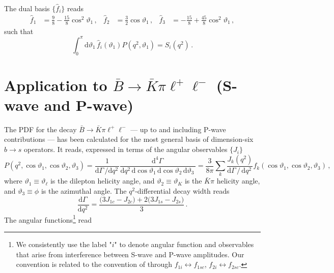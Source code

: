 \documentclass[aps,prd,reprint,nofootinbib,preprintnumbers]{revtex4}
\newcommand{\rmdx}[1]{\mbox{d} #1 \,} %
\renewcommand{\theta}{\vartheta}
\begin{document}
The dual basis $\lbrace \hat{f}_i\rbrace$ reads
\begin{equation}
\begin{aligned}
    \hat{f}_1 & = \frac{9}{8} - \frac{15}{8}\cos^2\theta_1\,, &
    \hat{f}_2 & = \frac{3}{2}\cos\theta_1\,, &
    \hat{f}_3 & = -\frac{15}{8} + \frac{45}{8}\cos^2\theta_1\,,
\end{aligned}
\end{equation}
such that
\begin{equation}
    \int_0^\pi \rmdx{\theta_1} \hat{f}_i(\theta_1) P(q^2, \theta_1) = S_i(q^2)\,.
\end{equation}

\section{Application to $\bar{B}\to\bar{K}\pi\ell^+\ell^-$ (S-wave and P-wave)}
\label{app:btokstarll}
The PDF for the decay $\bar{B}\to\bar{K}\pi\ell^+\ell^-$ --- up to and including P-wave contributions --- has been calculated
for the most general basis of dimension-six $b\to s$ operators. It reads, expressed in terms of the angular observables $\lbrace J_i\rbrace$ \cite{Blake:2012mb,Bobeth:2012vn}
\begin{equation}
    P(q^2, \cos\theta_1, \cos\theta_2, \theta_3) = \frac{1}{\rmdx{\Gamma}/\rmdx{q^2}} \frac{\rmdx{^4\Gamma}}{\rmdx{q^2} \rmdx{\cos\theta_1} \rmdx{\cos\theta_2} \rmdx{\theta_3}} = \frac{3}{8\pi} \sum_k \frac{J_{k}(q^2)}{\rmdx{\Gamma} /\, \rmdx{q^2}} f_k(\cos\theta_1, \cos\theta_2, \theta_3)\,,
\end{equation}
where $\theta_1 \equiv \theta_\ell$ is the dilepton helicity angle, and $\theta_2 \equiv \theta_{K}$ is the $\bar{K}\pi$ helicity angle, and $\theta_3 \equiv \phi$ is the azimuthal angle.
The $q^2$-differential decay width reads
\begin{equation}
    \frac{\rmdx{\Gamma}}{\rmdx{q^2}} = \frac{\big(3 J_{1c} - J_{2c}\big) + 2\big(3J_{1s} - J_{2s}\big)}{3}\,.
\end{equation}
The angular functions\footnote{%
    We consistently use the label "$i$" to denote angular function and observables that arise
    from interference between S-wave and P-wave amplitudes. Our convention is related to the convention
    of \cite{Bobeth:2012vn} through $f_{1i} \leftrightarrow f_{1sc}$, $f_{2i} \leftrightarrow f_{2sc}$.
} read \cite{Blake:2012mb,Bobeth:2012vn}
\end{document}
